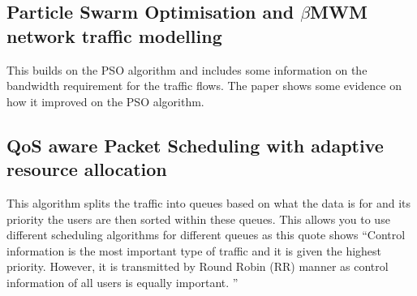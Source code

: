 {	\subsection{Particle Swarm Optimisation and $\beta$MWM network traffic modelling \cite{DRASwarmWthNetwork7250422}}
	{
		This builds on the PSO algorithm and includes some information on the bandwidth requirement for the traffic flows. The paper shows some evidence on how it improved on the PSO algorithm.

	}

	\subsection{QoS aware Packet Scheduling with adaptive resource allocation \cite{DRAPacketScheduling6192856}}
	{
		This algorithm splits the traffic into queues based on what the data is for and its priority the users are then sorted within these queues. This allows you to use different scheduling algorithms for different queues as this quote shows \enquote{Control information is the most important type of traffic and it is given the highest priority. However, it is transmitted by Round Robin (RR) manner as control information of all users is equally important. \cite{DRAPacketScheduling6192856}}
	}
}